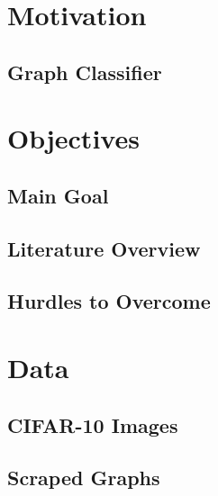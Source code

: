 \documentclass[12pt]{article}
\begin{document}
    \newpage \section{Motivation} 
    
        \subsection{Graph Classifier}
            
            
            

    \newpage \section{Objectives}

        \subsection{Main Goal}

           
        
        \subsection{Literature Overview}
        

        \subsection{Hurdles to Overcome}
        
    
        
    \newpage \section{Data}
            
        \subsection{CIFAR-10 Images}
    
           
            
        \subsection{Scraped Graphs}
    

            
          
\end{document}
